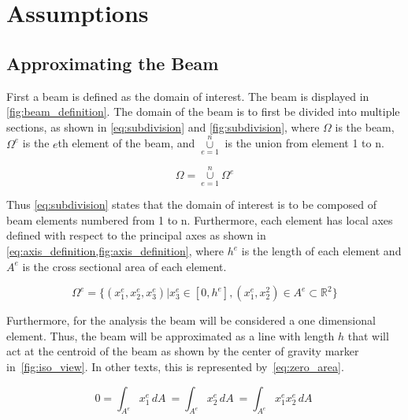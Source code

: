 \section{Assumptions}
\label{sec:assumptions}


\subsection{Approximating the Beam}
First a beam is defined as the domain of interest.
The beam is displayed in \cref{fig:beam_definition}.
The domain of the beam is to first be divided into multiple sections, as shown in \cref{eq:subdivision} and \cref{fig:subdivision}, where 
$\Omega$ is the beam,
$\Omega^e$  is the $e$th element of the beam, and
$\overset{n}{\underset{e=1}{\cup}}$ is the union from element 1 to n.

\begin{equation}
 \Omega = \overset{n}{\underset{e=1}{\cup}} \Omega^e
 \label{eq:subdivision}
 \end{equation}

Thus \cref{eq:subdivision} states that the domain of interest is to be composed of beam elements numbered from 1 to n.
Furthermore, each element has local axes defined with respect to the principal axes as shown in \cref{eq:axis_definition,fig:axis_definition}, where $h^e$ is the length of each element and $A^e$ is the cross sectional area of each element.

\begin{equation}
\Omega^e = \{
(x_1^e, x_2^e, x_3^e)
|x_3^e 
\in 
[0,h^e], 
(x_1^e, x_2^2) 
\in
A^e 
\subset
\mathbb{R}^2 
\}
\label{eq:axis_definition}
\end{equation}

Furthermore, for the analysis the beam will be considered a one dimensional element. 
Thus, the beam will be approximated as a line with length $h$ that will act at the centroid of the beam as shown by the center of gravity marker in~\cref{fig:iso_view}.
In other texts, this is represented by~\cref{eq:zero_area}.

\begin{equation}
0 =
\int_{A^e} x_1^e \,dA \  =
\int_{A^e} x_2^e \,dA \ =
\int_{A^e} x_1^e x_2^e \,dA \
\label{eq:zero_area}
\end{equation}




